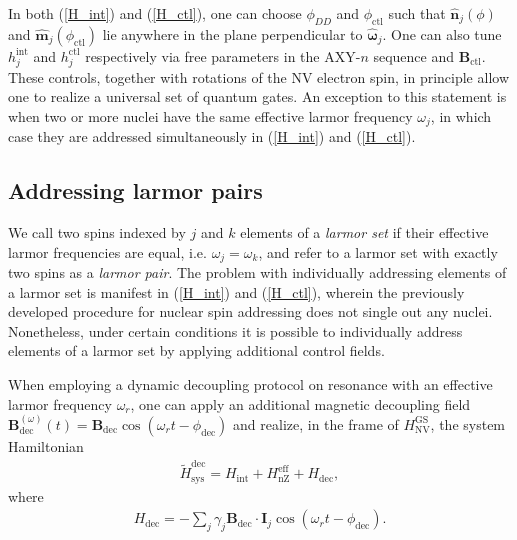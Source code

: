 \documentclass[twocolumn]{revtex4}
\renewcommand{\t}{\text} %
\newcommand{\p}[1]{\left(#1\right)} %
\renewcommand{\v}{\bm} %
\newcommand{\uv}[1]{\hat{\v{#1}}} %
\renewcommand{\c}{\cdot} %
\newcommand{\NV}{\t{NV}}
\begin{document}
In both (\ref{H_int}) and (\ref{H_ctl}), one can choose $\phi_{DD}$
and $\phi_\t{ctl}$ such that $\uv n_j\p\phi$ and
$\uv m_j\p{\phi_\t{ctl}}$ lie anywhere in the plane perpendicular to
$\uv\omega_j$. One can also tune $h_j^\t{int}$ and $h_j^\t{ctl}$
respectively via free parameters in the AXY-$n$ sequence and
$\v B_\t{ctl}$. These controls, together with rotations of the NV
electron spin, in principle allow one to realize a universal set of
quantum gates. An exception to this statement is when two or more
nuclei have the same effective larmor frequency $\omega_j$, in which
case they are addressed simultaneously in (\ref{H_int}) and
(\ref{H_ctl}).

\subsection{Addressing larmor pairs}

We call two spins indexed by $j$ and $k$ elements of a \emph{larmor
  set} if their effective larmor frequencies are equal,
i.e. $\omega_j=\omega_k$, and refer to a larmor set with exactly two
spins as a \emph{larmor pair}. The problem with individually
addressing elements of a larmor set is manifest in (\ref{H_int}) and
(\ref{H_ctl}), wherein the previously developed procedure for nuclear
spin addressing does not single out any nuclei. Nonetheless, under
certain conditions it is possible to individually address elements of
a larmor set by applying additional control fields.

When employing a dynamic decoupling protocol on resonance with an
effective larmor frequency $\omega_r$, one can apply an additional
magnetic decoupling field
$\v B_\t{dec}^{\p\omega}\p{t}=\v B_\t{dec}\cos\p{\omega_r
  t-\phi_\t{dec}}$ and realize, in the frame of $H_\NV^\t{GS}$, the
system Hamiltonian
\begin{align}
  \tilde H_\t{sys}^\t{dec} = H_\t{int} + H_\t{nZ}^\t{eff} + H_\t{dec},
\end{align}
where
\begin{align}
  H_\t{dec} = -\sum_j\gamma_j\v B_\t{dec}\c\v I_j
  \cos\p{\omega_rt-\phi_\t{dec}}.
\end{align}
\end{document}
